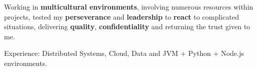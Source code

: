 
Working in \textbf{multicultural environments}, involving numerous
resources within projects, tested my \textbf{perseverance}
and \textbf{leadership} to \textbf{react} to complicated situations,
delivering \textbf{quality}, \textbf{confidentiality} and returning the
trust given to me.

\vspace{1.5em}

\begin{rlist}
  \item Experience: Distributed Systems, Cloud, Data and JVM + Python + Node.js environments.
\end{rlist}
